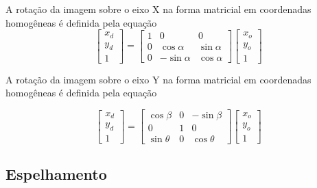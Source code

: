 \documentclass[12pt,oneside,a4paper,english,french,spanish,brazil,]{abntex2}
\begin{document}
A rotação da imagem sobre o eixo X na forma matricial em coordenadas homogêneas é definida pela equação
\[
\begin{bmatrix}
x_d\\ 
y_d\\ 
1
\end{bmatrix}
=
\begin{bmatrix}
1 & 0 & 0\\ 
0 & \cos{\alpha } & \sin{\alpha }\\ 
0 & -\sin{\alpha } & \cos{\alpha }
\end{bmatrix}
\begin{bmatrix}
x_o\\ 
y_o\\ 
1
\end{bmatrix}
\]

A rotação da imagem sobre o eixo Y na forma matricial em coordenadas homogêneas é definida pela equação

\[
\begin{bmatrix}
x_d\\ 
y_d\\ 
1
\end{bmatrix}
=
\begin{bmatrix}
\cos{\beta} & 0 & -\sin{\beta}\\ 
0 & 1 & 0 \\
\sin{\theta} & 0 & \cos{\theta} 
\end{bmatrix}
\begin{bmatrix}
x_o\\ 
y_o\\ 
1
\end{bmatrix}
\]


\subsection{Espelhamento}
\end{document}
